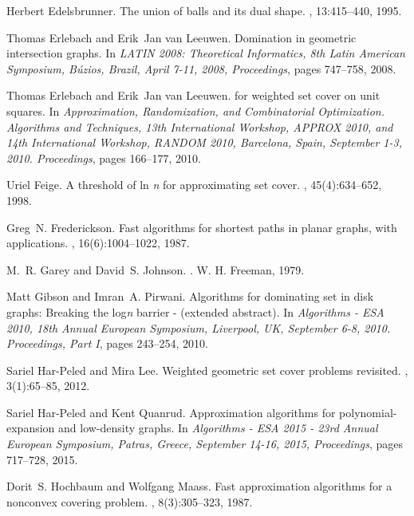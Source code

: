 \documentclass[a4paper,11pt]{article}
\begin{document}
\begin{thebibliography}{10}
Herbert Edelsbrunner.
\newblock The union of balls and its dual shape.
, 13:415--440, 1995.

Thomas Erlebach and Erik~Jan van Leeuwen.
\newblock Domination in geometric intersection graphs.
\newblock In {\em {LATIN} 2008: Theoretical Informatics, 8th Latin American
  Symposium, B{\'{u}}zios, Brazil, April 7-11, 2008, Proceedings}, pages
  747--758, 2008.

Thomas Erlebach and Erik~Jan van Leeuwen.
 for weighted set cover on unit squares.
\newblock In {\em Approximation, Randomization, and Combinatorial Optimization.
  Algorithms and Techniques, 13th International Workshop, {APPROX} 2010, and
  14th International Workshop, {RANDOM} 2010, Barcelona, Spain, September 1-3,
  2010. Proceedings}, pages 166--177, 2010.

Uriel Feige.
\newblock A threshold of ln \emph{n} for approximating set cover.
, 45(4):634--652, 1998.

Greg~N. Frederickson.
\newblock Fast algorithms for shortest paths in planar graphs, with
  applications.
, 16(6):1004--1022, 1987.

M.~R. Garey and David~S. Johnson.
.
\newblock W. H. Freeman, 1979.

Matt Gibson and Imran~A. Pirwani.
\newblock Algorithms for dominating set in disk graphs: Breaking the
  log\emph{n} barrier - (extended abstract).
\newblock In {\em Algorithms - {ESA} 2010, 18th Annual European Symposium,
  Liverpool, UK, September 6-8, 2010. Proceedings, Part {I}}, pages 243--254,
  2010.

Sariel Har{-}Peled and Mira Lee.
\newblock Weighted geometric set cover problems revisited.
, 3(1):65--85, 2012.

Sariel Har{-}Peled and Kent Quanrud.
\newblock Approximation algorithms for polynomial-expansion and low-density
  graphs.
\newblock In {\em Algorithms - {ESA} 2015 - 23rd Annual European Symposium,
  Patras, Greece, September 14-16, 2015, Proceedings}, pages 717--728, 2015.

Dorit~S. Hochbaum and Wolfgang Maass.
\newblock Fast approximation algorithms for a nonconvex covering problem.
, 8(3):305--323, 1987.


\end{thebibliography}
\end{document}
